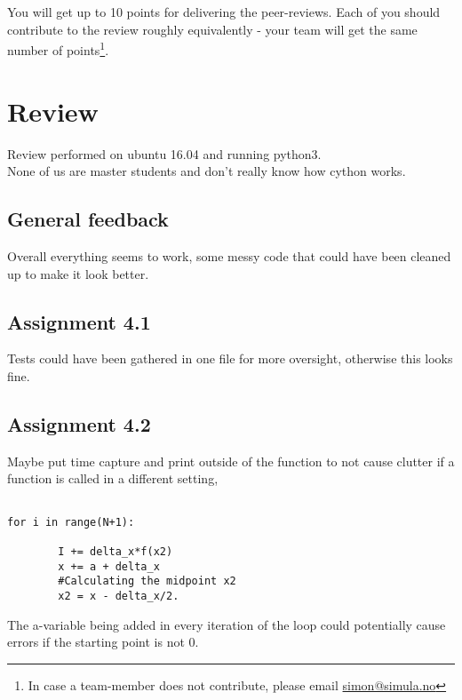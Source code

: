 \documentclass[a4paper]{article}
\begin{document}
You will get up to 10 points for delivering the peer-reviews. Each of you should contribute to the review roughly equivalently - your team will get the same number of points\footnote{In case a team-member does not contribute, please email \href{mailto:simon@simula.no}{simon@simula.no}}. 



\section{Review \emph{}}\label{sec:review}

Review performed on ubuntu 16.04 and running python3.\\
None of us are master students and don't really know how cython works.
\subsection*{General feedback}
Overall everything seems to work, some messy code that could have been cleaned up to make it look better.

\subsection*{Assignment 4.1}

Tests could have been gathered in one file for more oversight, otherwise this looks fine.


\subsection*{Assignment 4.2} \label{sec:assignment5.2}

Maybe put time capture and print outside of the function to not cause clutter if a function is called in a different setting, 

\begin{verbatim}

for i in range(N+1):

		I += delta_x*f(x2)
		x += a + delta_x
		#Calculating the midpoint x2
		x2 = x - delta_x/2.

\end{verbatim}

The a-variable being added in every iteration of the loop could potentially cause errors if the starting point is not 0.
\end{document}
